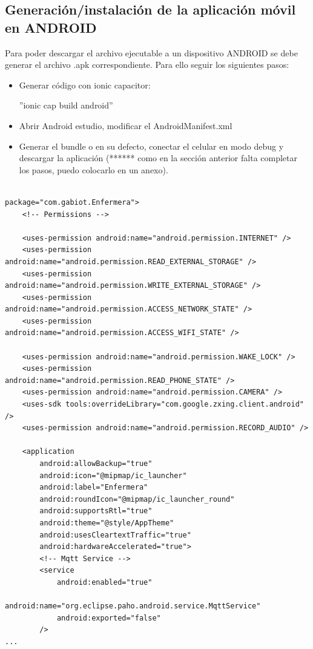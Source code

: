 \subsection{Generación/instalación de la aplicación móvil en ANDROID}

Para poder descargar el archivo ejecutable a un dispositivo ANDROID se debe generar el archivo .apk correspondiente. Para ello seguir los siguientes pasos:

\begin{itemize}
\item Generar código con ionic capacitor:

''ionic cap build android''
\item Abrir Android estudio, modificar el AndroidManifest.xml
\item Generar el bundle o en su defecto, conectar el celular en modo debug y descargar la aplicación (****** como en la sección anterior  falta completar los pasos, puedo colocarlo en un anexo).
\end{itemize}
\pagebreak


\begin{lstlisting}[label=cod:AndroidMan,caption=Modificaciones al Android Manifest.]  % Start your code-block

package="com.gabiot.Enfermera">
    <!-- Permissions -->

    <uses-permission android:name="android.permission.INTERNET" />
    <uses-permission android:name="android.permission.READ_EXTERNAL_STORAGE" />
    <uses-permission android:name="android.permission.WRITE_EXTERNAL_STORAGE" />
    <uses-permission android:name="android.permission.ACCESS_NETWORK_STATE" />
    <uses-permission android:name="android.permission.ACCESS_WIFI_STATE" />

    <uses-permission android:name="android.permission.WAKE_LOCK" />
    <uses-permission android:name="android.permission.READ_PHONE_STATE" />
    <uses-permission android:name="android.permission.CAMERA" />
    <uses-sdk tools:overrideLibrary="com.google.zxing.client.android" />
    <uses-permission android:name="android.permission.RECORD_AUDIO" />

    <application
        android:allowBackup="true"
        android:icon="@mipmap/ic_launcher"
        android:label="Enfermera"
        android:roundIcon="@mipmap/ic_launcher_round"
        android:supportsRtl="true"
        android:theme="@style/AppTheme"
        android:usesCleartextTraffic="true"
        android:hardwareAccelerated="true">
        <!-- Mqtt Service -->
        <service
            android:enabled="true"
            android:name="org.eclipse.paho.android.service.MqttService"
            android:exported="false"
        />
...

\end{lstlisting}
\pagebreak
